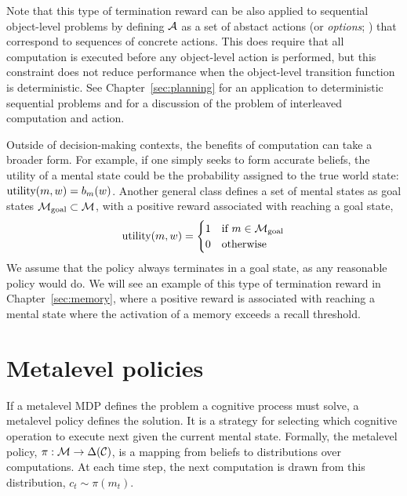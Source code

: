 Note that this type of termination reward can be also applied to sequential object-level problems by defining $\mathcal{A}$ as a set of abstact actions (or \emph{options}; \citealp{sutton1999mdps}) that correspond to sequences of concrete actions. This does require that all computation is executed before any object-level action is performed, but this constraint does not reduce performance when the object-level transition function is deterministic. See Chapter~\ref{sec:planning} for an application to deterministic sequential problems and  for a discussion of the problem of interleaved computation and action.

Outside of decision-making contexts, the benefits of computation can take a broader form. For example, if one simply seeks to form accurate beliefs, the utility of a mental state could be the probability assigned to the true world state: $\text{utility}(m, w) = b_m(w)$. Another general class defines a set of mental states as goal states $\mathcal{M}_{\mathrm{goal}} \subset \mathcal{M}$, with a positive reward associated with reaching a goal state,
%
\begin{equation}\label{eq:goal-term}
  \text{utility}(m, w) = \begin{cases}
    1 &\text{if } m \in \mathcal{M}_{\mathrm{goal}} \\
    0 &\text{otherwise}
  \end{cases}
\end{equation}
%
We assume that the policy always terminates in a goal state, as any reasonable policy would do. We will see an example of this type of termination reward in Chapter~\ref{sec:memory}, where a positive reward is associated with reaching a mental state where the activation of a memory exceeds a recall threshold.


\section{Metalevel policies}\label{sec:metamdp-policy}

If a metalevel MDP defines the problem a cognitive process must solve, a metalevel policy defines the solution. It is a strategy for selecting which cognitive operation to execute next given the current mental state. Formally, the metalevel policy, $\pi: \mathcal{M} \rightarrow \Delta(\mathcal{C})$, is a mapping from beliefs to distributions over computations. At each time step, the next computation is drawn from this distribution, $c_t \sim \pi(m_t)$.

